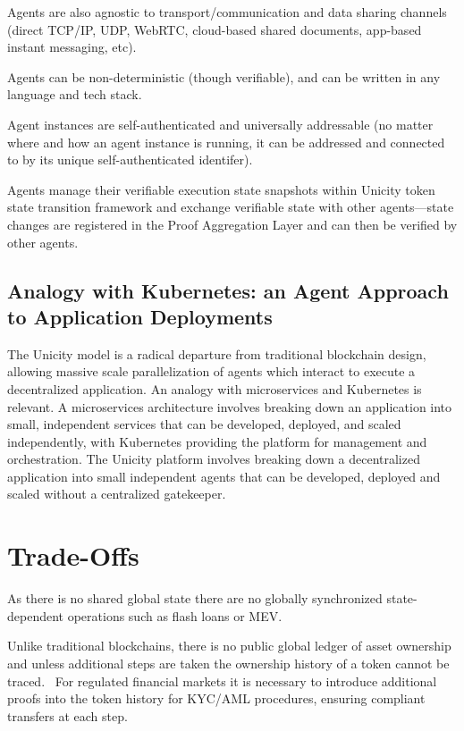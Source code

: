 \documentclass{article}
\begin{document}
Agents are also agnostic to transport/communication and data sharing channels (direct TCP/IP, UDP, WebRTC, cloud-based shared documents, app-based instant messaging, etc).

Agents can be non-deterministic (though verifiable), and can be written in any language and tech stack.

Agent instances are self-authenticated and universally addressable (no matter where and how an agent instance is running, it can be addressed and connected to by its unique self-authenticated identifer).

Agents manage their verifiable execution state snapshots within Unicity token state transition framework and exchange verifiable state with other agents---state changes are registered in the Proof Aggregation Layer and can then be verified by other agents.

\subsection{Analogy with Kubernetes: an Agent Approach to Application Deployments}

The Unicity model is a radical departure from traditional blockchain design, allowing massive scale parallelization of agents which interact to execute a decentralized application. An analogy with microservices and Kubernetes is relevant. A microservices architecture involves breaking down an application into small, independent services that can be developed, deployed, and scaled independently, with Kubernetes providing the platform for management and orchestration. The Unicity platform involves breaking down a decentralized application into small independent agents that can be developed, deployed and scaled without a centralized gatekeeper.

\section{Trade-Offs}

As there is no shared global state there are no globally synchronized state-dependent operations such as flash loans or MEV.

Unlike traditional blockchains, there is no public global ledger of asset ownership and unless additional steps are taken the ownership history of a token cannot be traced.  For regulated financial markets it is necessary to introduce additional proofs into the token history for KYC/AML procedures, ensuring compliant transfers at each step.
\end{document}
